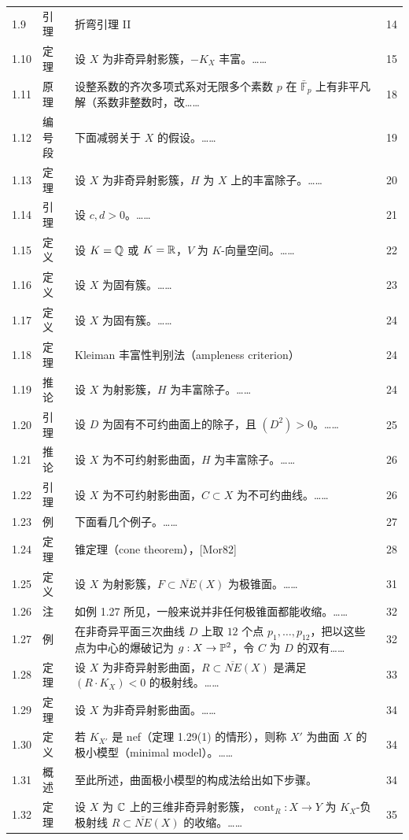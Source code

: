 \begin{longtable}{@{}p{}p{}p{}p{}@{}}
1.9 & 引理 & 折弯引理 II & 14 \\
1.10 & 定理 & 设 $X$ 为非奇异射影簇，$-K_X$ 丰富。…… & 15 \\
1.11 & 原理 & 设整系数的齐次多项式系对无限多个素数 $p$ 在 $\bar{\mathbb{F}}_p$ 上有非平凡解（系数非整数时，改…… & 18 \\
1.12 & 编号段 & 下面减弱关于 $X$ 的假设。…… & 19 \\
1.13 & 定理 & 设 $X$ 为非奇异射影簇，$H$ 为 $X$ 上的丰富除子。…… & 20 \\
1.14 & 引理 & 设 $c,d>0$。…… & 21 \\
1.15 & 定义 & 设 $K=\mathbb{Q}$ 或 $K=\mathbb{R}$，$V$ 为 $K$-向量空间。…… & 22 \\
1.16 & 定义 & 设 $X$ 为固有簇。…… & 23 \\
1.17 & 定义 & 设 $X$ 为固有簇。…… & 24 \\
1.18 & 定理 & Kleiman 丰富性判别法（ampleness criterion） & 24 \\
1.19 & 推论 & 设 $X$ 为射影簇，$H$ 为丰富除子。…… & 24 \\
1.20 & 引理 & 设 $D$ 为固有不可约曲面上的除子，且 $(D^2)>0$。…… & 25 \\
1.21 & 推论 & 设 $X$ 为不可约射影曲面，$H$ 为丰富除子。…… & 26 \\
1.22 & 引理 & 设 $X$ 为不可约射影曲面，$C\subset X$ 为不可约曲线。…… & 26 \\
1.23 & 例 & 下面看几个例子。…… & 27 \\
1.24 & 定理 & 锥定理（cone theorem），[Mor82] & 28 \\
1.25 & 定义 & 设 $X$ 为射影簇，$F\subset\overline{NE}(X)$ 为极锥面。…… & 31 \\
1.26 & 注 & 如例 1.27 所见，一般来说并非任何极锥面都能收缩。…… & 32 \\
1.27 & 例 & 在非奇异平面三次曲线 $D$ 上取 $12$ 个点 $p_1,\dots,p_{12}$，把以这些点为中心的爆破记为 $g:X\to\mathbb{P}^2$，令 $C$ 为 $D$ 的双有…… & 32 \\
1.28 & 定理 & 设 $X$ 为非奇异射影曲面，$R\subset\overline{NE}(X)$ 是满足 $(R\cdot K_X)<0$ 的极射线。…… & 33 \\
1.29 & 定理 & 设 $X$ 为非奇异射影曲面。…… & 34 \\
1.30 & 定义 & 若 $K_{X'}$ 是 nef（定理 1.29(1) 的情形），则称 $X'$ 为曲面 $X$ 的极小模型（minimal model）。…… & 34 \\
1.31 & 概述 & 至此所述，曲面极小模型的构成法给出如下步骤。 & 34 \\
1.32 & 定理 & 设 $X$ 为 $\mathbb{C}$ 上的三维非奇异射影簇，$\operatorname{cont}_R:X\to Y$ 为 $K_X$-负极射线 $R\subset\overline{NE}(X)$ 的收缩。…… & 35 \\

\end{longtable}
